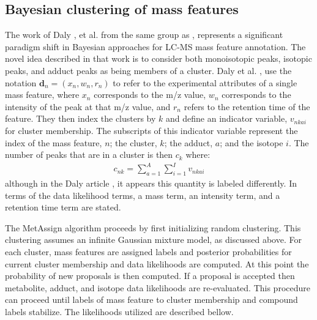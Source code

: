 \begin{DoubleSpace*}
\section{Bayesian clustering of mass features}
The work of Daly \cite{daly2014}, et al. from the same group as \cite{rogers2009}, represents a significant paradigm shift in Bayesian approaches for LC-MS mass feature annotation. The novel idea described in that work is to consider both monoisotopic peaks, isotopic peaks, and adduct peaks as being members of a cluster. Daly et al. \cite{daly2014}, use the notation $\textbf{d}_n = (x_n,w_n,r_n)$ to refer to the experimental attributes of a single mass feature, where $x_n$ corresponds to the m/z value, $w_n$ corresponds to the intensity of the peak at that m/z value, and $r_n$ refers to the retention time of the feature. They then index the clusters by $k$ and define an indicator variable, $v_{nkai}$ for cluster membership. The subscripts of this indicator variable represent the index of the mass feature, $n$; the cluster, $k$; the adduct, $a$; and the isotope $i$. The number of peaks that are in a cluster is then $c_k$ where:
\begin{align}
	c_{nk}=\sum_{a=1}^A \sum_{i=1}^I v_{nkai}
\end{align}
although in the Daly article \cite{daly2014}, it appears this quantity is labeled differently. In terms of the data likelihood terms, a mass term, an intensity term, and a retention time term are stated. 

The MetAssign algorithm proceeds by first initializing random clustering. This clustering assumes an infinite Gaussian mixture model, as discussed above. For each cluster, mass features are assigned labels and posterior probabilities for current cluster membership and data likelihoods are computed. At this point the probability of new proposals is then computed.  If a proposal is accepted then metabolite, adduct, and isotope data likelihoods are re-evaluated. This procedure can proceed until labels of mass feature to cluster membership and compound labels stabilize. The likelihoods utilized are described bellow.


\end{DoubleSpace*}
